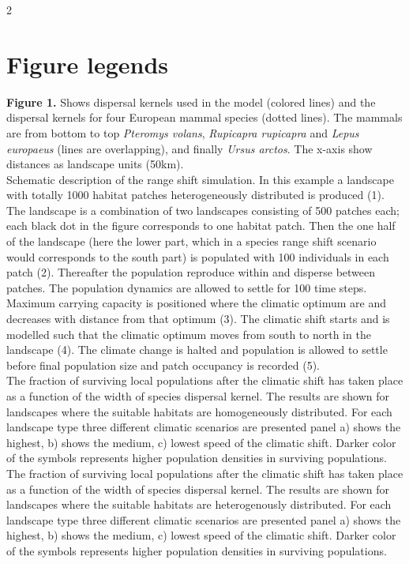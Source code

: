 \documentclass[12pt,pdftex]{article}
\begin{document}
\begin{spacing}{2}
\section*{Figure legends}

{\bf Figure 1.} Shows dispersal kernels used in the model (colored lines) and the dispersal kernels for four European mammal species (dotted lines). The mammals are from bottom to top {\em Pteromys volans}, {\em Rupicapra rupicapra} and {\em Lepus europaeus} (lines are overlapping), and finally {\em Ursus arctos}. The x-axis show distances as landscape units (50km). \\

 Schematic description of the range shift simulation. In this example a landscape with totally 1000 habitat patches heterogeneously distributed is produced (1). The landscape is a combination of two landscapes consisting of 500 patches each;  each black dot in the figure corresponds to one habitat patch. Then the one half of the landscape (here the lower part, which in a species range shift scenario would corresponds to the south part) is populated with 100 individuals in each patch (2). Thereafter the population reproduce within and disperse between patches. The population dynamics are allowed to settle for 100 time steps. Maximum carrying capacity is positioned where the climatic optimum are and decreases with distance from that optimum (3). The climatic shift starts and is modelled such that the climatic optimum moves from south to north in the landscape (4). The climate change is halted and population is allowed to settle before final population size and patch occupancy is recorded (5).\\

 The fraction of surviving local populations after the climatic shift has taken place as a function of the width of species dispersal kernel. The results are shown for landscapes where the suitable habitats are homogeneously distributed. For each landscape type three different climatic scenarios are presented panel a) shows the highest, b)  shows the medium, c) lowest speed of the climatic shift. Darker color of the symbols represents higher population densities in surviving populations.\\

 The fraction of surviving local populations after the climatic shift has taken place as a function of the width of species dispersal kernel. The results are shown for landscapes where the suitable habitats are heterogenously distributed. For each landscape type three different climatic scenarios are presented panel a) shows the highest, b)  shows the medium, c) lowest speed of the climatic shift. Darker color of the symbols represents higher population densities in surviving populations.\\


\end{spacing}
\end{document}
